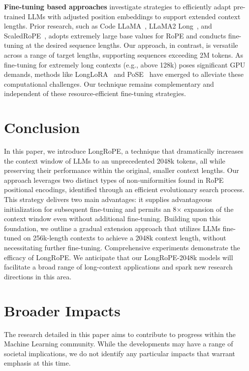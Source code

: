 \textbf{Fine-tuning based approaches} investigate strategies to efficiently adapt pre-trained LLMs with adjusted position embeddings to support extended context lengths. Prior research, such as Code LLaMA~\cite{codellama}, LLaMA2 Long~\cite{xiong2023effective}, and ScaledRoPE~\cite{liu2023scaling}, adopts extremely large base values for RoPE and conducts fine-tuning at the desired sequence lengths. Our approach, in contrast, is versatile across a range of target lengths, supporting sequences exceeding 2M tokens. As fine-tuning for extremely long contexts (e.g., above 128k) poses significant GPU demands, methods like LongLoRA~\cite{longlora} and PoSE~\cite{zhu2023pose} have emerged to alleviate these computational challenges. Our technique remains complementary and independent of these resource-efficient fine-tuning strategies.

\section{Conclusion}

In this paper, we introduce LongRoPE, a technique that dramatically increases the context window of LLMs to an unprecedented 2048k tokens, all while preserving their performance within the original, smaller context lengths. Our approach leverages two distinct types of non-uniformities found in RoPE positional encodings, identified through an efficient evolutionary search process. This strategy delivers two main advantages: it supplies advantageous initialization for subsequent fine-tuning and permits an 8$\times$ expansion of the context window even without additional fine-tuning. Building upon this foundation, we outline a gradual extension approach that utilizes LLMs fine-tuned on 256k-length contexts to achieve a 2048k context length, without necessitating further fine-tuning. Comprehensive experiments demonstrate the efficacy of LongRoPE. We anticipate that our LongRoPE-2048k models will facilitate a broad range of long-context applications and spark new research directions in this area.

\section*{Broader Impacts} The research detailed in this paper aims to contribute to progress within the Machine Learning community. While the developments may have a range of societal implications, we do not identify any particular impacts that warrant emphasis at this time.

	\balance

